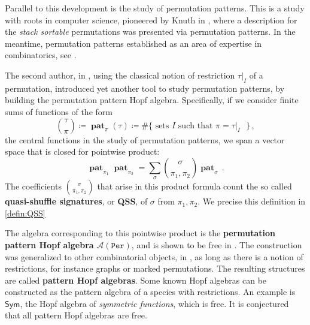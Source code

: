 \documentclass[submission]{FPSAC2023}
\theoremstyle{definition}
\DeclareMathOperator{\pat}{\mathbf{pat}}
\begin{document}

Parallel to this development is the study of permutation patterns.
This is a study with roots in computer science, pioneered by Knuth in \cite{Knuth}, where a description for the \textit{stack sortable} permutations was presented via permutation patterns.
In the meantime, permutation patterns established as an area of expertise in combinatorics, see \cite{linton2010permutation}.

The second author, in \cite{Vargas}, using the classical notion of restriction $\tau|_I$ of a permutation, introduced yet another tool to study permutation patterns, by building the permutation pattern Hopf algebra.
Specifically, if we consider finite sums of functions of the form 
$$ \binom{\tau}{\pi} \coloneqq \pat_{\pi}(\tau)\coloneqq  \#\{\text{ sets $I$ such that $\pi= \tau|_I$ }\}\, ,$$
the central functions in the study of permutation patterns, we span a vector space that is closed for pointwise product:
\begin{equation}\label{eq:prodperm}
\pat_{\pi_1} \pat_{\pi_2} = \sum_{\sigma} \binom{\sigma}{\pi_1, \pi_2} \pat_{\sigma} \, .
\end{equation}
The coefficients $\binom{\sigma}{\pi_1, \pi_2}$ that arise in this product formula count the so called \textbf{quasi-shuffle signatures}, or \textbf{QSS}, of $\sigma$ from $\pi_1, \pi_2$.
We precise this definition in \cref{defin:QSS}

The algebra corresponding to this pointwise product is the \textbf{permutation pattern Hopf algebra} $\mathcal{A}(\mathtt{Per})$, and is shown to be free in \cite{Vargas}. The construction was generalized to other combinatorial objects, in \cite{Penaguiao2020}, as long as there is a notion of restrictions, for instance graphs or marked permutations.
The resulting structures are called \textbf{pattern Hopf algebras}. Some known Hopf algebras can be constructed as the pattern algebra of a species with restrictions.
An example is $\mathsf{Sym}$, the Hopf algebra of \textit{symmetric functions}, which is free.
It is conjectured that all pattern Hopf algebras are free.
\end{document}
